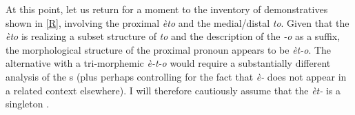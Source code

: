 \par
At this point, let us return for a moment to the inventory of  demonstratives shown in \ref{R}, involving the proximal \textit{\`eto} and the medial/distal \textit{to}.  Given that the  \textit{\`eto} is realizing a subset structure of \textit{to} and the description of the \textit{-o} as a suffix, the morphological structure of the  proximal pronoun appears to be \textit{\`et-o}. The alternative with a tri-mor\-phe\-mic \textit{\`e-t-o} would require a substantially different analysis of the  s (plus perhaps controlling for the fact that \textit{\`e-} does not appear in a related context elsewhere). I will therefore cautiously assume that the  \textit{\`et-} is a singleton .
\par
